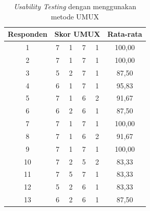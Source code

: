 \begin{table}[H]
	\centering
	\caption{\textit{Usability Testing} dengan menggunakan metode UMUX}
	\label{UMUX}
	\begin{tabular}{|ccccc|c|}
		\hline
		\multicolumn{1}{|c|}{Responden} & \multicolumn{4}{c|}{Skor UMUX} & Rata-rata                                                    \\ \hline
		\multicolumn{1}{|c|}{1}         & \multicolumn{1}{c|}{7}         & \multicolumn{1}{c|}{1} & \multicolumn{1}{c|}{7} & 1 & 100,00 \\ \hline
		\multicolumn{1}{|c|}{2}         & \multicolumn{1}{c|}{7}         & \multicolumn{1}{c|}{1} & \multicolumn{1}{c|}{7} & 1 & 100,00 \\ \hline
		\multicolumn{1}{|c|}{3}         & \multicolumn{1}{c|}{5}         & \multicolumn{1}{c|}{2} & \multicolumn{1}{c|}{7} & 1 & 87,50  \\ \hline
		\multicolumn{1}{|c|}{4}         & \multicolumn{1}{c|}{6}         & \multicolumn{1}{c|}{1} & \multicolumn{1}{c|}{7} & 1 & 95,83  \\ \hline
		\multicolumn{1}{|c|}{5}         & \multicolumn{1}{c|}{7}         & \multicolumn{1}{c|}{1} & \multicolumn{1}{c|}{6} & 2 & 91,67  \\ \hline
		\multicolumn{1}{|c|}{6}         & \multicolumn{1}{c|}{6}         & \multicolumn{1}{c|}{2} & \multicolumn{1}{c|}{6} & 1 & 87,50  \\ \hline
		\multicolumn{1}{|c|}{7}         & \multicolumn{1}{c|}{7}         & \multicolumn{1}{c|}{1} & \multicolumn{1}{c|}{7} & 1 & 100,00 \\ \hline
		\multicolumn{1}{|c|}{8}         & \multicolumn{1}{c|}{7}         & \multicolumn{1}{c|}{1} & \multicolumn{1}{c|}{6} & 2 & 91,67  \\ \hline
		\multicolumn{1}{|c|}{9}         & \multicolumn{1}{c|}{7}         & \multicolumn{1}{c|}{1} & \multicolumn{1}{c|}{7} & 1 & 100,00 \\ \hline
		\multicolumn{1}{|c|}{10}        & \multicolumn{1}{c|}{7}         & \multicolumn{1}{c|}{2} & \multicolumn{1}{c|}{5} & 2 & 83,33  \\ \hline
		\multicolumn{1}{|c|}{11}        & \multicolumn{1}{c|}{7}         & \multicolumn{1}{c|}{5} & \multicolumn{1}{c|}{7} & 1 & 83,33  \\ \hline
		\multicolumn{1}{|c|}{12}        & \multicolumn{1}{c|}{5}         & \multicolumn{1}{c|}{2} & \multicolumn{1}{c|}{6} & 1 & 83,33  \\ \hline
		\multicolumn{1}{|c|}{13}        & \multicolumn{1}{c|}{6}         & \multicolumn{1}{c|}{2} & \multicolumn{1}{c|}{6} & 1 & 87,50  \\ \hline

\end{tabular}
\end{table}

